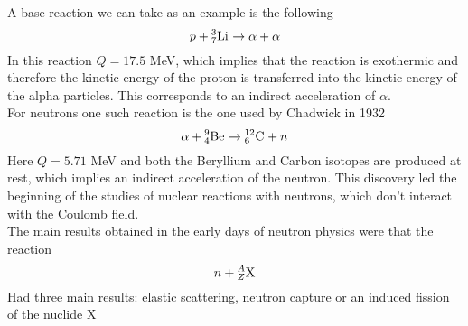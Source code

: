 \documentclass[../qm.tex]{subfiles}
\begin{document}
A base reaction we can take as an example is the following
\begin{equation*}
	p+\nuc{Li}{3}{7}\to\alpha+\alpha
\end{equation*}
In this reaction $Q=17.5$ MeV, which implies that the reaction is exothermic and therefore the kinetic energy of the proton is transferred into the kinetic energy of the alpha particles. This corresponds to an indirect acceleration of $\alpha$.\\
For neutrons one such reaction is the one used by Chadwick in 1932
\begin{equation*}
	\alpha+\nuc{Be}{9}{4}\to\nuc{C}{12}{6}+n
\end{equation*}
Here $Q=5.71$ MeV and both the Beryllium and Carbon isotopes are produced at rest, which implies an indirect acceleration of the neutron. This discovery led the beginning of the studies of nuclear reactions with neutrons, which don't interact with the Coulomb field.\\
The main results obtained in the early days of neutron physics were that the reaction
\begin{equation*}
	n+\nuc{X}{A}{Z}
\end{equation*}
Had three main results: elastic scattering, neutron capture or an induced fission of the nuclide X
\end{document}
